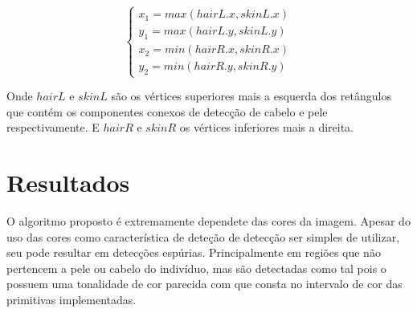 \documentclass[journal,onecolumn]{IEEEtran}
\begin{document}
	 \begin{equation}
	 	\begin{cases}
	 	x_1 = max(hairL.x,skinL.x) \\
	 	y_1 = max(hairL.y,skinL.y) \\
	 	
	 	x_2 = min(hairR.x,skinR.x) \\
	 	y_2 = min(hairR.y,skinR.y) 
	 	\end{cases}
	 	\label{eq:intersectionPositions}
	 \end{equation}
	 
	Onde $hairL$ e $skinL$ são os vértices superiores mais a esquerda dos retângulos que contém os componentes conexos de detecção de cabelo e pele respectivamente.
	E $hairR$ e $skinR$ os vértices inferiores mais a direita.
	
	\section{Resultados}
	O algoritmo proposto é extremamente dependete das cores da imagem. 
	Apesar do uso das cores como característica de deteção de detecção ser simples de utilizar, seu pode resultar  em detecções espúrias.
	Principalmente em regiões que não pertencem a pele ou cabelo do indivíduo, mas são detectadas como tal pois o possuem uma tonalidade de cor parecida com que consta no intervalo de cor das primitivas implementadas.
\end{document}
